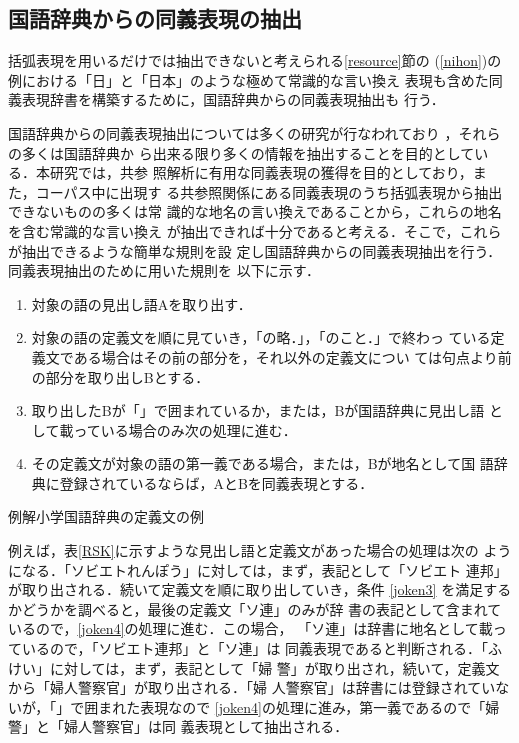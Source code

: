 \documentclass[japanese]{jnlp_1.4}
\begin{document}
  \subsection{国語辞典からの同義表現の抽出}

  括弧表現を用いるだけでは抽出できないと考えられる\ref{resource}節の
  (\ref{nihon})の例における「日」と「日本」のような極めて常識的な言い換え
  表現も含めた同義表現辞書を構築するために，国語辞典からの同義表現抽出も
  行う．

  国語辞典からの同義表現抽出については多くの研究が行なわれており
  \cite{Tsurumaru1991,Tokunaga2001,Nichols2005}，それらの多くは国語辞典か
  ら出来る限り多くの情報を抽出することを目的としている．本研究では，共参
  照解析に有用な同義表現の獲得を目的としており，また，コーパス中に出現す
  る共参照関係にある同義表現のうち括弧表現から抽出できないものの多くは常
  識的な地名の言い換えであることから，これらの地名を含む常識的な言い換え
  が抽出できれば十分であると考える．そこで，これらが抽出できるような簡単な規則を設
  定し国語辞典からの同義表現抽出を行う．同義表現抽出のために用いた規則を
  以下に示す．
  \begin{enumerate}
   \item 対象の語の見出し語Aを取り出す．
   \item 対象の語の定義文を順に見ていき，「の略．」，「のこと．」で終わっ
	 ている定義文である場合はその前の部分を，それ以外の定義文につい
	 ては句点より前の部分を取り出しBとする．
   \item 取り出したBが「」で囲まれているか，または，Bが国語辞典に見出し語
	 として載っている場合のみ次の処理に進む．\label{joken3}
   \item その定義文が対象の語の第一義である場合，または，Bが地名として国
	 語辞典に登録されているならば，AとBを同義表現とする．
	 \label{joken4}
  \end{enumerate}

  \begin{table}[b]
   \caption{例解小学国語辞典の定義文の例}
   \label{RSK}

  \end{table}

  例えば，表\ref{RSK}に示すような見出し語と定義文があった場合の処理は次の
  ようになる．「ソビエトれんぽう」に対しては，まず，表記として「ソビエト
  連邦」が取り出される．続いて定義文を順に取り出していき，条件
  \ref{joken3} を満足するかどうかを調べると，最後の定義文「ソ連」のみが辞
  書の表記として含まれているので，\ref{joken4}の処理に進む．この場合，
  「ソ連」は辞書に地名として載っているので，「ソビエト連邦」と「ソ連」は
  同義表現であると判断される．「ふけい」に対しては，まず，表記として「婦
  警」が取り出され，続いて，定義文から「婦人警察官」が取り出される．「婦
  人警察官」は辞書には登録されていないが，「」で囲まれた表現なので
  \ref{joken4}の処理に進み，第一義であるので「婦警」と「婦人警察官」は同
  義表現として抽出される．
\end{document}
